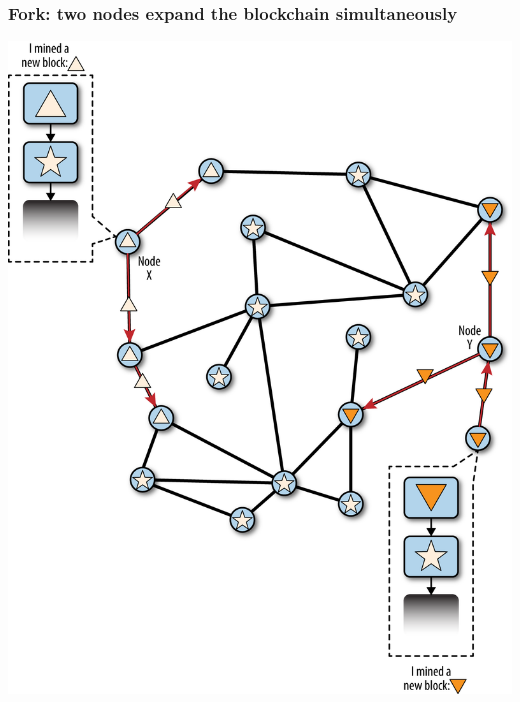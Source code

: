 \documentclass[11pt]{beamer}  %
\begin{document}
\begin{frame}\frametitle{Fork: two nodes expand the blockchain simultaneously}

  \begin{center}
    \includegraphics[scale=0.53,clip=false]{pictures/mbc2_1003.png}
  \end{center}

\end{frame}
\end{document}

